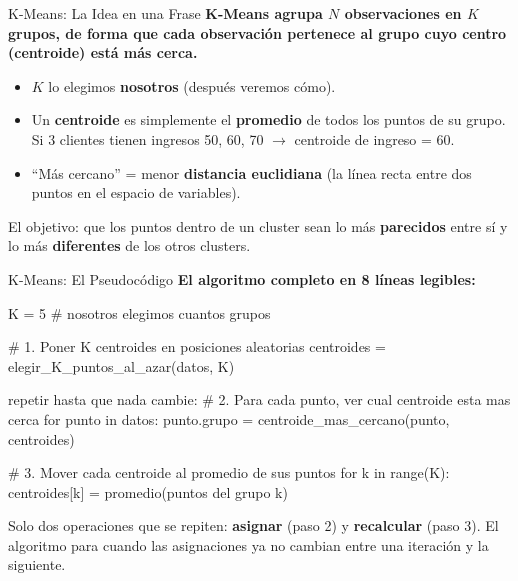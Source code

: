 \documentclass[aspectratio=169, 11pt]{beamer}
\begin{document}
\begin{frame}{K-Means: La Idea en una Frase}
  \vspace{-4pt}
  {\footnotesize\color{arcaDark}\bfseries
    K-Means agrupa $N$ observaciones en $K$ grupos, de forma que
    cada observaci\'on pertenece al grupo cuyo \textbf{centro}
    (centroide) est\'a m\'as cerca.}

  \vspace{8pt}
  {\footnotesize
  \begin{itemize}\setlength{\itemsep}{5pt}
    \item[{\color{arcaRed}\scriptsize\faArrowRight}]
      $K$ lo elegimos \textbf{nosotros} (despu\'es veremos c\'omo).
    \item[{\color{arcaRed}\scriptsize\faArrowRight}]
      Un \textbf{centroide} es simplemente el \textbf{promedio} de
      todos los puntos de su grupo. Si 3 clientes tienen ingresos
      50, 60, 70 $\to$ centroide de ingreso = 60.
    \item[{\color{arcaRed}\scriptsize\faArrowRight}]
      ``M\'as cercano'' = menor \textbf{distancia euclidiana}
      (la l\'inea recta entre dos puntos en el espacio de variables).
  \end{itemize}
  }

  \vspace{6pt}
  {\scriptsize\color{textMuted}
    \faLightbulb\hspace{4pt} El objetivo: que los puntos dentro de un
    cluster sean lo m\'as \textbf{parecidos} entre s\'i y lo m\'as
    \textbf{diferentes} de los otros clusters.}
\end{frame}

\begin{frame}[fragile,shrink=10]{K-Means: El Pseudoc\'odigo}
  \vspace{-4pt}
  {\footnotesize\color{arcaDark}\bfseries
    El algoritmo completo en 8 l\'ineas legibles:}

  \vspace{4pt}
  \begin{pyblock}
K = 5   # nosotros elegimos cuantos grupos

# 1. Poner K centroides en posiciones aleatorias
centroides = elegir_K_puntos_al_azar(datos, K)

repetir hasta que nada cambie:
    # 2. Para cada punto, ver cual centroide esta mas cerca
    for punto in datos:
        punto.grupo = centroide_mas_cercano(punto, centroides)

    # 3. Mover cada centroide al promedio de sus puntos
    for k in range(K):
        centroides[k] = promedio(puntos del grupo k)
  \end{pyblock}

  \vspace{4pt}
  {\scriptsize\color{arcaDark}
    \faKey\hspace{4pt} Solo dos operaciones que se repiten:
    \textbf{asignar} (paso 2) y \textbf{recalcular} (paso 3).
    El algoritmo para cuando las asignaciones ya no cambian
    entre una iteraci\'on y la siguiente.}
\end{frame}
\end{document}

